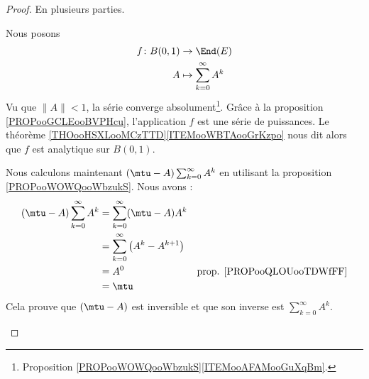 \begin{proof}
	En plusieurs parties.
	\begin{subproof}
		\spitem[Analytique]
		Nous posons
		\begin{equation}
			\begin{aligned}
				f\colon B(0,1) & \to \End(E)                    \\
				A              & \mapsto \sum_{k=0}^{\infty}A^k
			\end{aligned}
		\end{equation}
		Vu que \( \| A \|<1\), la série converge absolument\footnote{Proposition \ref{PROPooWOWQooWbzukS}\ref{ITEMooAFAMooGuXqBm}.}. Grâce à la proposition \ref{PROPooGCLEooBVPHcu}, l'application \( f\) est une série de puissances. Le théorème \ref{THOooHSXLooMCzTTD}\ref{ITEMooWBTAooGrKzpo} nous dit alors que \( f\) est analytique sur \( B(0,1)\).

		\spitem[Inverse]
		Nous calculons maintenant \( (\mtu-A)\sum_{k=0}^{\infty}A^k\) en utilisant la proposition \ref{PROPooWOWQooWbzukS}. Nous avons :
		\begin{subequations}
			\begin{align}
				(\mtu-A)\sum_{k=0}^{\infty}A^k & =\sum_{k=0}^{\infty}(\mtu-A)A^k                                                     \\
				                               & =\sum_{k=0}^{\infty}\big( A^k-A^{k+1} \big)                                         \\
				                               & =A^0                                        & \text{prop. \ref{PROPooQLOUooTDWfFF}} \\
				                               & =\mtu
			\end{align}
		\end{subequations}
		Cela prouve que \( (\mtu-A)\) est inversible et que son inverse est \( \sum_{k=0}^{\infty}A^k\).
	\end{subproof}
\end{proof}

